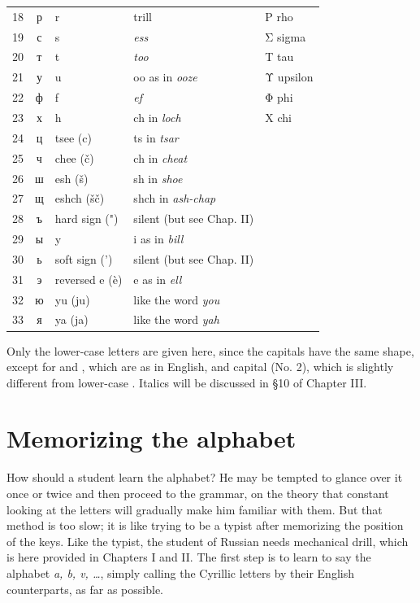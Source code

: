 \begin{longtable}{@{}r >{\cyrillicfont}c p{36mm} p{48mm} p{28mm}@{}}
18 & р & r & trill & Ρ rho\\
19 & с & s & \emph{ess} & Σ sigma\\
20 & т & t & \emph{too} & Τ tau\\
21 & у & u & oo as in \emph{ooze} & Υ upsilon\\
22 & ф & f & \emph{ef} & Φ phi\\
23 & х & h & ch in \emph{loch} & Χ chi\\
24 & ц & tsee (c) & ts in \emph{tsar} & \\
25 & ч & chee (č) & ch in \emph{cheat} & \\
26 & ш & esh (š) & sh in \emph{shoe} & \\
27 & щ & eshch (šč) & shch in \emph{ash-chap} & \\
28 & ъ & hard sign (") & silent (but see Chap. II) & \\
29 & ы & y & i as in \emph{bill} & \\
30 & ь & soft sign (') & silent (but see Chap. II) & \\
31 & э & reversed e (è) & e as in \emph{ell} & \\
32 & ю & yu (ju) & like the word \emph{you} & \\
33 & я & ya (ja) & like the word \emph{yah} & \\
\bottomrule
\end{longtable}
\endgroup

Only the lower-case letters are given here, since the capitals have the same shape, except for  and , which are as in English, and capital  (No. 2), which is slightly different from lower-case . Italics will be discussed in §10 of Chapter III.

\section{Memorizing the alphabet}

How should a student learn the alphabet? He may be tempted to glance over it once or twice and then proceed to the grammar, on the theory that constant looking at the letters will gradually make him familiar with them. But that method is too slow; it is like trying to be a typist after memorizing the position of the keys. Like the typist, the student of Russian needs mechanical drill, which is here provided in Chapters I and II. The first step is to learn to say the alphabet \emph{a, b, v, \ldots}, simply calling the Cyrillic letters by their English counterparts, as far as possible.

